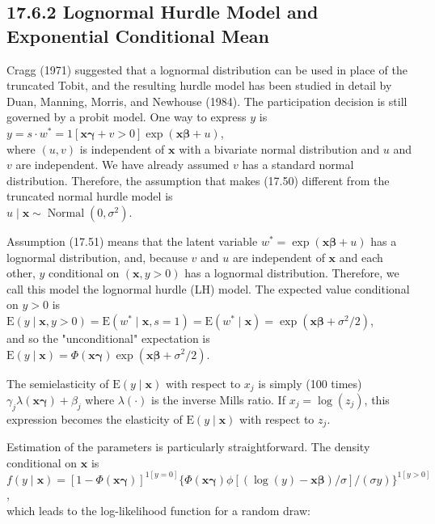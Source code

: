 \documentclass[10pt]{article}
\begin{document}
\subsection*{17.6.2 Lognormal Hurdle Model and Exponential Conditional Mean}
Cragg (1971) suggested that a lognormal distribution can be used in place of the truncated Tobit, and the resulting hurdle model has been studied in detail by Duan, Manning, Morris, and Newhouse (1984). The participation decision is still governed by a probit model. One way to express $y$ is\\
$y=s \cdot w^{*}=1[\mathbf{x} \boldsymbol{\gamma}+v>0] \exp (\mathbf{x} \boldsymbol{\beta}+u)$,\\
where $(u, v)$ is independent of $\mathbf{x}$ with a bivariate normal distribution and $u$ and $v$ are independent. We have already assumed $v$ has a standard normal distribution. Therefore, the assumption that makes (17.50) different from the truncated normal hurdle model is\\
$u \mid \mathbf{x} \sim \operatorname{Normal}\left(0, \sigma^{2}\right)$.

Assumption (17.51) means that the latent variable $w^{*}=\exp (\mathbf{x} \boldsymbol{\beta}+u)$ has a lognormal distribution, and, because $v$ and $u$ are independent of $\mathbf{x}$ and each other, $y$ conditional on $(\mathbf{x}, y>0)$ has a lognormal distribution. Therefore, we call this model the lognormal hurdle (LH) model. The expected value conditional on $y>0$ is\\
$\mathrm{E}(y \mid \mathbf{x}, y>0)=\mathrm{E}\left(w^{*} \mid \mathbf{x}, s=1\right)=\mathrm{E}\left(w^{*} \mid \mathbf{x}\right)=\exp \left(\mathbf{x} \boldsymbol{\beta}+\sigma^{2} / 2\right)$,\\
and so the "unconditional" expectation is\\
$\mathrm{E}(y \mid \mathbf{x})=\Phi(\mathbf{x} \boldsymbol{\gamma}) \exp \left(\mathbf{x} \boldsymbol{\beta}+\sigma^{2} / 2\right)$.

The semielasticity of $\mathrm{E}(y \mid \mathbf{x})$ with respect to $x_{j}$ is simply (100 times) $\gamma_{j} \lambda(\mathbf{x} \boldsymbol{\gamma})+\beta_{j}$ where $\lambda(\cdot)$ is the inverse Mills ratio. If $x_{j}=\log \left(z_{j}\right)$, this expression becomes the elasticity of $\mathrm{E}(y \mid \mathbf{x})$ with respect to $z_{j}$.

Estimation of the parameters is particularly straightforward. The density conditional on $\mathbf{x}$ is\\
$f(y \mid \mathbf{x})=[1-\Phi(\mathbf{x} \boldsymbol{\gamma})]^{1[y=0]}\{\Phi(\mathbf{x} \boldsymbol{\gamma}) \phi[(\log (y)-\mathbf{x} \boldsymbol{\beta}) / \sigma] /(\sigma y)\}^{1[y>0]}$,\\
which leads to the log-likelihood function for a random draw:
\end{document}
